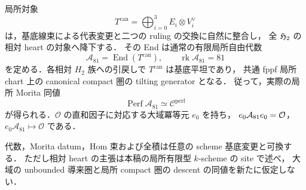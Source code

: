 \begin{proposition}
\label{prop:qa-universal-h2-square-morita81}
局所対象
\[
 T^{\mathrm{can}}=\bigoplus_{i=0}^3 E_i\otimes V_i^\vee
 \tag{T81}\label{eq:qa-h2-canonical-amplified-generator}
\]
は，基底線束による代表変更と二つの ruling の交換に自然に整合し，
全 $\mathfrak H_2$ の相対 heart の対象へ降下する．
その End は通常の有限局所自由代数
\[
 \mathcal A_{81}=\operatorname{End}(T^{\mathrm{can}}),
 \qquad \operatorname{rk}\mathcal A_{81}=81
\]
を定める．各相対 $H_2$ 族への引戻しで $T^{\mathrm{can}}$ は基底平坦であり，
共通 fppf 局所 chart 上の canonical compact 圏の tilting generator となる．
従って，実際の局所 Morita 同値
\[
 \operatorname{Perf}\mathcal A_{81}\simeq\mathcal C^{\mathrm{perf}}
\]
が得られる．$\mathcal O$ の直和因子に対応する大域冪等元 $e_0$ を持ち，
$e_0\mathcal A_{81}e_0=\mathcal O$，$e_0\mathcal A_{81}\mapsto\mathcal O$ である．

代数，Morita datum，Hom 束および全積は任意の scheme 基底変更と可換する．
ただし相対 heart の主張は本稿の局所有限型 $k$-scheme の site で述べ，
大域の unbounded 導来圏と局所 compact 圏の descent の同値を新たに仮定しない．
\end{proposition}
